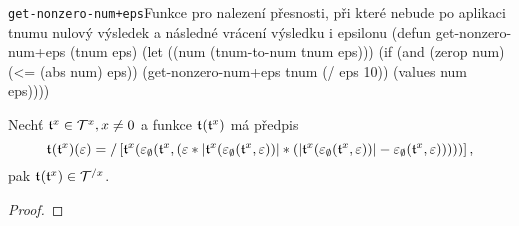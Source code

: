 \begin{lispcode}{\texttt{get-nonzero-num+eps}}{Funkce pro nalezení přesnosti, při které nebude po aplikaci tnumu nulový výsledek a následné vrácení výsledku i epsilonu}
(\textcolor{funkcionalni}{defun} \textcolor{pojmenovan}{get-nonzero-num+eps} (tnum eps)
  (\textcolor{vedlejsi}{let} ((num (\textcolor{moje}{tnum-to-num} tnum eps)))
    (\textcolor{funkcionalni}{if} (\textcolor{funkcionalni}{and} (\textcolor{funkcionalni}{zerop} num) (\textcolor{matematicke}{<=} (\textcolor{matematicke}{abs} num) eps))
        (\textcolor{moje}{get-nonzero-num+eps} tnum (\textcolor{matematicke}{/} eps 10))
      (\textcolor{matematicke}{values} num eps))))
\end{lispcode}

\begin{theorem}\label{hyp:prevraceni_tnumu}
Nechť $\mathfrak{t}^{x}\in\mathcal{T}^{x},x\neq 0$ a funkce $\mathfrak{t}^{}(\mathfrak{t}^{x})$ má předpis
\begin{equation}
\mathfrak{t}^{}(\mathfrak{t}^{x})(\varepsilon)=/\left[\mathfrak{t}^{x}(\varepsilon_\emptyset(\mathfrak{t}^{x}, (\varepsilon*|\mathfrak{t}^{x}(\varepsilon_\emptyset(\mathfrak{t}^{x}, \varepsilon))|*(|\mathfrak{t}^{x}(\varepsilon_\emptyset(\mathfrak{t}^{x}, \varepsilon))|-\varepsilon_\emptyset(\mathfrak{t}^{x}, \varepsilon)))))\right],
\end{equation}
pak $\mathfrak{t}^{}(\mathfrak{t}^{x})\in\mathcal{T}^{/x}$.
\begin{proof}


\end{proof}
\end{theorem}
